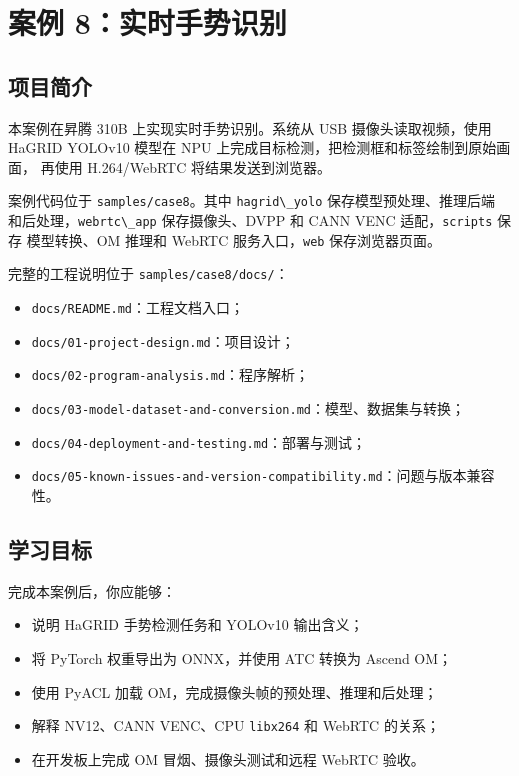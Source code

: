 \chapter{案例
8：实时手势识别}\label{ux6848ux4f8b-8ux5b9eux65f6ux624bux52bfux8bc6ux522b}

\section{项目简介}\label{ux9879ux76eeux7b80ux4ecb}

本案例在昇腾 310B 上实现实时手势识别。系统从 USB 摄像头读取视频，使用
HaGRID YOLOv10 模型在 NPU 上完成目标检测，把检测框和标签绘制到原始画面，
再使用 H.264/WebRTC 将结果发送到浏览器。

案例代码位于 \passthrough{\lstinline!samples/case8!}。其中
\passthrough{\lstinline!hagrid\_yolo!} 保存模型预处理、推理后端
和后处理，\passthrough{\lstinline!webrtc\_app!} 保存摄像头、DVPP 和 CANN
VENC 适配，\passthrough{\lstinline!scripts!} 保存 模型转换、OM 推理和
WebRTC 服务入口，\passthrough{\lstinline!web!} 保存浏览器页面。

完整的工程说明位于 \passthrough{\lstinline!samples/case8/docs/!}：

\begin{itemize}
\tightlist
\item
  \passthrough{\lstinline!docs/README.md!}：工程文档入口；
\item
  \passthrough{\lstinline!docs/01-project-design.md!}：项目设计；
\item
  \passthrough{\lstinline!docs/02-program-analysis.md!}：程序解析；
\item
  \passthrough{\lstinline!docs/03-model-dataset-and-conversion.md!}：模型、数据集与转换；
\item
  \passthrough{\lstinline!docs/04-deployment-and-testing.md!}：部署与测试；
\item
  \passthrough{\lstinline!docs/05-known-issues-and-version-compatibility.md!}：问题与版本兼容性。
\end{itemize}

\section{学习目标}\label{ux5b66ux4e60ux76eeux6807}

完成本案例后，你应能够：

\begin{itemize}
\tightlist
\item
  说明 HaGRID 手势检测任务和 YOLOv10 输出含义；
\item
  将 PyTorch 权重导出为 ONNX，并使用 ATC 转换为 Ascend OM；
\item
  使用 PyACL 加载 OM，完成摄像头帧的预处理、推理和后处理；
\item
  解释 NV12、CANN VENC、CPU \passthrough{\lstinline!libx264!} 和 WebRTC
  的关系；
\item
  在开发板上完成 OM 冒烟、摄像头测试和远程 WebRTC 验收。
\end{itemize}

